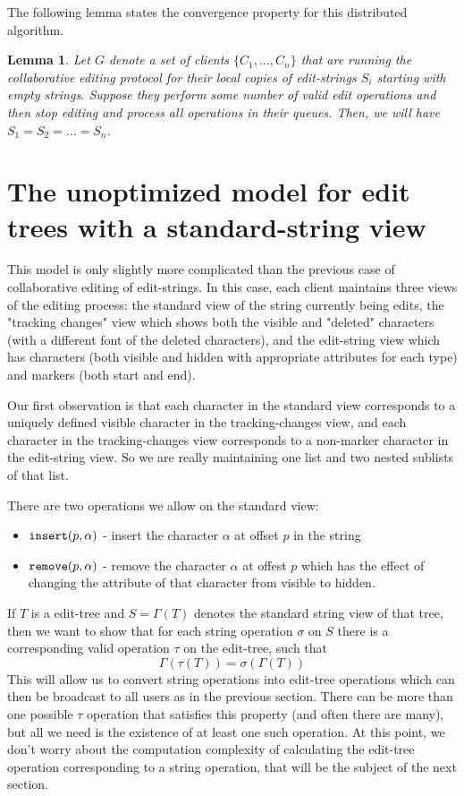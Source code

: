 \documentclass{amsart}
\newtheorem{lemma}[theorem]{Lemma}
\begin{document}
The following
lemma states the convergence property for this distributed algorithm.


\begin{lemma}
Let $G$ denote a set of clients $\{C_1,\ldots,C_n\}$
that are running the collaborative
editing protocol for their local copies of edit-strings $S_i$
starting with empty strings.
Suppose they perform some number of valid
edit operations and then stop editing and process all operations in their queues.
Then, 
we will have $S_1=S_2=\ldots=S_n$.
\end{lemma}



\section{The unoptimized model for edit trees with a standard-string view}

This model is only slightly more complicated than the previous case of
collaborative editing of edit-strings.  In this case, each client maintains three
views of the editing process: the standard view of the string currently being edits,
the "tracking changes" view which shows both the visible and "deleted" characters (with a different font of the deleted characters), and the edit-string view which
has characters (both visible and hidden with appropriate attributes for each type)
and markers (both start and end). 

Our first observation is that each character in the standard view corresponds
to a uniquely defined visible character in the tracking-changes view, and
each character in the tracking-changes view corresponds to a non-marker character in the edit-string view. So we are really maintaining one list and two nested sublists of that list.

There are two operations we allow on the standard view:
\begin{itemize}
\item ${\tt insert}(p,\alpha)$ - insert the character $\alpha$ 
at offset $p$ in the string
\item ${\tt remove}(p,\alpha)$ - remove the character $\alpha$ at offest $p$
which has the effect of changing the attribute of that character from visible to hidden.
\end{itemize}

If $T$ is a edit-tree and $S = \Gamma(T)$ denotes the standard string view
of that tree, then we want to show that for each string operation $\sigma$
on $S$ there is a corresponding valid operation $\tau$
on the edit-tree, such that 
\[
\Gamma(\tau(T)) = \sigma(\Gamma(T))
\]
This will allow us to convert string operations into edit-tree operations which
can then be broadcast to all users as in the previous section. There can be more than one possible $\tau$ operation that satisfies this property (and often there are many), but all we need is the existence of at least one such operation. At this point, we don't worry about the computation complexity of calculating the edit-tree operation corresponding to a string operation, that will be the subject of the next section.
\end{document}
